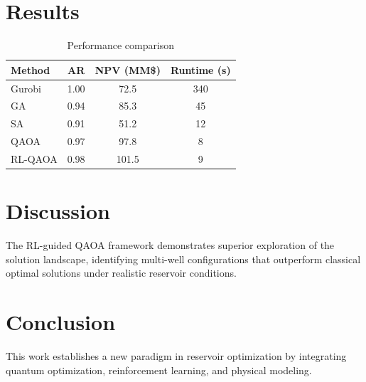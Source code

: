 \documentclass[preprint,12pt]{elsarticle}
\begin{document}
\section{Results}

\begin{table}[h]
\centering
\begin{tabular}{lccc}
\toprule
Method & AR & NPV (MM\$) & Runtime (s) \\
\midrule
Gurobi & 1.00 & 72.5 & 340 \\
GA & 0.94 & 85.3 & 45 \\
SA & 0.91 & 51.2 & 12 \\
QAOA & 0.97 & 97.8 & 8 \\
RL-QAOA & 0.98 & 101.5 & 9 \\
\bottomrule
\end{tabular}
\caption{Performance comparison}
\end{table}

\section{Discussion}

The RL-guided QAOA framework demonstrates superior exploration of the solution landscape, identifying multi-well configurations that outperform classical optimal solutions under realistic reservoir conditions.

\section{Conclusion}

This work establishes a new paradigm in reservoir optimization by integrating quantum optimization, reinforcement learning, and physical modeling.
\end{document}
